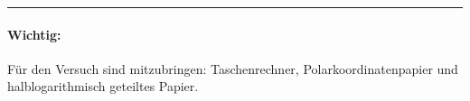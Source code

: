 \documentclass[12pt, a4paper]{article}
\begin{document}
\begin{enumerate}
\end{enumerate}

\hrule
\paragraph{Wichtig:} Für den Versuch sind mitzubringen: Taschenrechner, Polarkoordinatenpapier
und halblogarithmisch geteiltes Papier.
\end{document}
